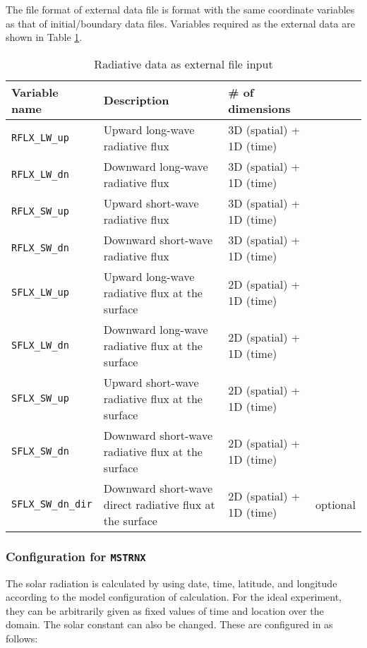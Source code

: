 \noindent
The file format of external data file is \netcdf format
with the same coordinate variables as that of initial/boundary data files.
Variables required as the external data are shown in Table \ref{tab:var_list_atm_rd_offline}.\\

\begin{table}[h]
\begin{center}
  \caption{Radiative data as external file input}
  \label{tab:var_list_atm_rd_offline}
  \begin{tabularx}{150mm}{lXll} \hline
    \rowcolor[gray]{0.9}  Variable name & Description & \# of dimensions & \\ \hline
      \verb|RFLX_LW_up|     & Upward long-wave radiative flux & 3D (spatial) + 1D (time) \\
      \verb|RFLX_LW_dn|     & Downward long-wave radiative flux & 3D (spatial) + 1D (time) \\
      \verb|RFLX_SW_up|     & Upward short-wave radiative flux & 3D (spatial) + 1D (time) \\
      \verb|RFLX_SW_dn|     & Downward short-wave radiative flux & 3D (spatial) + 1D (time) \\
      \verb|SFLX_LW_up|     & Upward long-wave radiative flux at the surface & 2D (spatial) + 1D (time) \\
      \verb|SFLX_LW_dn|     & Downward long-wave radiative flux at the surface & 2D (spatial) + 1D (time) \\
      \verb|SFLX_SW_up|     & Upward short-wave radiative flux at the surface & 2D (spatial) + 1D (time) \\
      \verb|SFLX_SW_dn|     & Downward short-wave radiative flux at the surface & 2D (spatial) + 1D (time) \\
      \verb|SFLX_SW_dn_dir| & Downward short-wave direct radiative flux at the surface & 2D (spatial) + 1D (time) & optional \\
    \hline
  \end{tabularx}
\end{center}
\end{table}

\subsubsection{Configuration for \texttt{MSTRNX}}

The solar radiation is calculated by using date, time, latitude, and longitude according to the model configuration of calculation.
For the ideal experiment, they can be arbitrarily given as fixed values of time and location over the domain.
The solar constant can also be changed. These are configured in  as follows:

